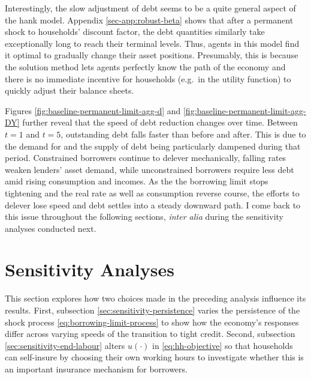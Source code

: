 \documentclass[a4paper,12pt]{article} %
\numberwithin{equation}{section} %
\numberwithin{figure}{section}
\numberwithin{table}{section}
\begin{document}
Interestingly, the slow adjustment of debt seems to be a quite general aspect of the \Gls{hank} model. Appendix \ref{sec-app:robust-beta} shows that after a permanent shock to households' discount factor, the debt quantities similarly take exceptionally long to reach their terminal levels. Thus, agents in this model find it optimal to gradually change their asset positions. Presumably, this is because the solution method lets agents perfectly know the path of the economy and there is no immediate incentive for households (e.g.~in the utility function) to quickly adjust their balance sheets.

Figures \ref{fig:baseline-permanent-limit-agg-d} and \ref{fig:baseline-permanent-limit-agg-DY} further reveal that the speed of debt reduction changes over time. Between $t=1$ and $t=5$, outstanding debt falls faster than before and after. This is due to the demand for and the supply of debt being particularly dampened during that period. Constrained borrowers continue to delever mechanically, falling rates weaken lenders' asset demand, while unconstrained borrowers require less debt amid rising consumption and incomes. As the the borrowing limit stops tightening and the real rate as well as consumption reverse course, the efforts to delever lose speed and debt settles into a steady downward path. I come back to this issue throughout the following sections, \textit{inter alia} during the sensitivity analyses conducted next.

\section{Sensitivity Analyses}
\label{sec:sensitivity}

This section explores how two choices made in the preceding analysis influence its results. First, subsection \ref{sec:sensitivity-persistence} varies the persistence of the shock process \eqref{eq:borrowing-limit-process} to show how the economy's responses differ across varying speeds of the transition to tight credit. Second, subsection \ref{sec:sensitivity-end-labour} alters $u( \cdot )$ in \eqref{eq:hh-objective} so that households can self-insure by choosing their own working hours to investigate whether this is an important insurance mechanism for borrowers.
\end{document}
